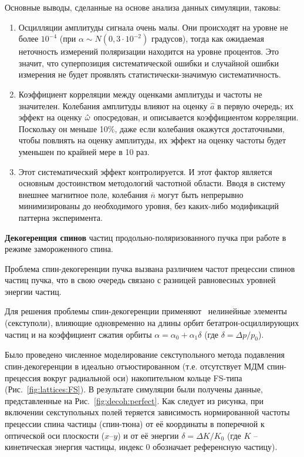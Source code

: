 Основные выводы, сделанные на основе анализа данных симуляции, таковы:
\begin{enumerate}
	\item Осцилляции амплитуды сигнала очень малы. Они происходят на уровне не более $10^{-4}$ (при
	${\alpha\sim N(0, 3\cdot 10^{-2})}$ градусов), тогда как ожидаемая неточность измерений поляризации находится
	на уровне процентов. Это значит, что суперпозиция систематической ошибки и случайной ошибки измерения
	не будет проявлять статистически-значимую систематичность.
	\item Коэффициент корреляции между оценками амплитуды и частоты не значителен. Колебания амплитуды
	влияют на оценку $\hat a$ в первую очередь; их эффект на оценку $\hat{\omega}$ опосредован, и описывается
	коэффициентом корреляции. Поскольку он меньше 10\%, даже если колебания окажутся достаточными, чтобы повлиять
	на оценку амплитуды, их эффект на оценку частоты будет уменьшен по крайней мере в 10 раз.
	\item Этот систематический эффект контролируется. И этот фактор является основным достоинством методологий
	частотной области. Вводя в систему внешнее магнитное поле,	колебания $\bar n$ могут быть 
	непрерывно минимизированы  до необходимого уровня, без каких-либо модификаций паттерна эксперимента.
\end{enumerate}

\textbf{Декогеренция спинов} частиц продольно-поляризованного пучка 
при работе в режиме замороженного спина.

Проблема спин-декогеренции пучка вызвана различием частот прецессии спинов частиц пучка, 
что в свою очередь связано с разницей равновесных уровней энергии частиц. 

Для решения проблемы спин-декогеренции применяют~\cite{COSY:SCT:IPAC15, COSY:SCT:1000sec} 
нелинейные элементы (секступоли), влияющие одновременно на длины орбит бетатрон-осциллирующих частиц  
и на коэффициент сжатия орбиты ${\alpha = \alpha_0 + \alpha_1\delta}$ (где ${\delta=\Delta p/p_0}$).

Было проведено численное моделирование секступольного метода подавления спин-декогеренции 
в идеально отъюстированном (т.е. отсутствует МДМ спин-прецессия вокруг радиальной оси) накопительном кольце 
FS-типа (Рис.~\ref{fig:lattices:FS}). В результате симуляции были получены данные, представленные на Рис.~\ref{fig:decoh:perfect}. Как следует из рисунка, при включении секступольных полей теряется зависимость
нормированной частоты прецессии спина частицы (спин-тюна) от её координаты в поперечной к оптической оси
 плоскости ($x$--$y$) и от её энергии $\delta = \Delta K/K_0$ 
 (где $K$ -- кинетическая энергия частицы, индекс 0 обозначает референсную частицу).

